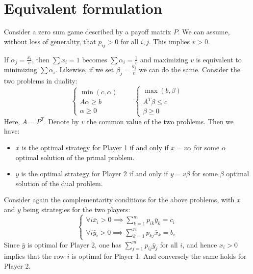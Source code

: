 \section{Equivalent formulation}

Consider a zero sum game described by a payoff matrix $P$. 
We can assume, without loss of generality, that $p_{ij}>0$ for all $i,j$.
This implies $v>0$.

If $\alpha_j=\frac{x_i}{v}$, then $\sum x_i=1$ becomes $\sum \alpha_i=\frac{1}{v}$ and maximizing $v$ is equivalent to minimizing $\sum\alpha_i$.
Likewise, if we set $\beta_j=\frac{y_j}{v}$ we can do the same. 
Consider the two problems in duality: 
\[\begin{cases}
    \min (c,\alpha) \\
    A\alpha\geq b \\
    \alpha\geq 0
\end{cases} \qquad \begin{cases}
    \max (b,\beta) \\
    A^T\beta\leq c \\
    \beta\geq 0
\end{cases}\]
Here, $A=P^T$. 
Denote by $v$ the common value of the two problems.
Then we have: 
\begin{itemize}
    \item $x$ is the optimal strategy for Player 1 if and only if $x=v\alpha$ for some $\alpha$ optimal solution of the primal problem.
    \item $y$ is the optimal strategy for Player 2 if and only if $y=v\beta$ for some $\beta$ optimal solution of the dual problem.
\end{itemize}

Consider again the complementarity conditions for the above problems, with $x$ and $y$ being strategies for the two players: 
\[\begin{cases}
    \forall i \bar{x}_i>0 \implies\sum_{k=1}^mp_{ik}\bar{y}_k=c_i \\
    \forall i \bar{y}_i>0 \implies\sum_{k=1}^np_{kj}\bar{x}_k=b_i 
\end{cases}\]
Since $\bar{y}$ is optimal for Player 2, one has $\sum_{j=1}^mp_{ij}\bar{y}_j$ for all $i$, and hence $x_i>0$ implies that the row $i$ is optimal for Player 1.
And conversely the same holds for Player 2.